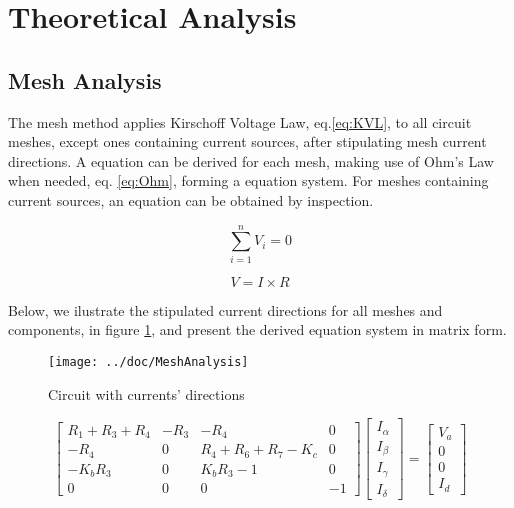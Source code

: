 \section{Theoretical Analysis}
\label{sec:analysis}

\subsection{Mesh Analysis}

\par The mesh method applies Kirschoff Voltage Law, eq.\ref{eq:KVL}, to all circuit meshes, except ones containing current sources, after stipulating mesh current directions. A equation can be derived for each mesh, making use of Ohm's Law when needed, eq. \ref{eq:Ohm}, forming a equation system. For meshes containing current sources, an equation can be obtained by inspection.

\begin{multicols}{2}
\begin{equation}
    \sum_{i=1}^{n} V_i = 0
    \label{eq:KVL}
\end{equation}

\begin{equation}
    V = I \times R
    \label{eq:Ohm}
\end{equation}
\end{multicols}

Below, we ilustrate the stipulated current directions for all meshes and components, in figure \ref{fig:figmesh}, and present the derived equation system in matrix form.


\begin{figure}[H]
  \centering
  \texttt{[image: ../doc/MeshAnalysis]}
  \caption{Circuit with currents' directions}
  \label{fig:figmesh}
\end{figure}

\begin{equation*}
\begin{bmatrix} R_1+R_3+R_4 & -R_3 & -R_4 & 0 \\
 -R_4 & 0 & R_4+R_6+R_7-K_c & 0 \\
 -K_bR_3 & 0 & K_bR_3-1 & 0 \\
 0 & 0 & 0 & -1 \end{bmatrix} \begin{bmatrix} I_{\alpha}\\ I_{\beta}\\ I_{\gamma} \\ I_{\delta} \end{bmatrix} = \begin{bmatrix} V_a\\ 0\\ 0\\ I_d \end{bmatrix}
\end{equation*}

